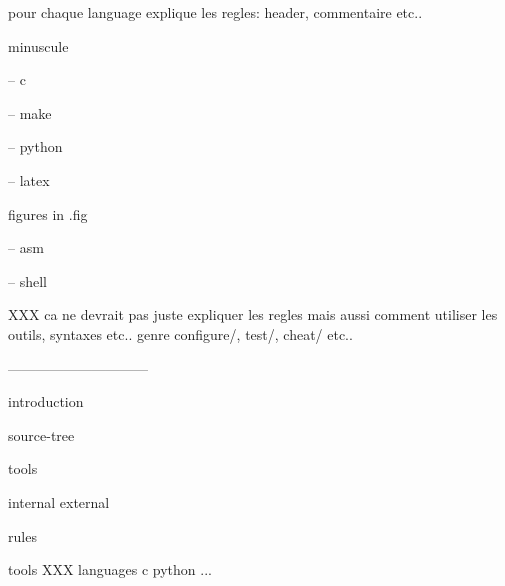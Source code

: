 pour chaque language explique les regles: header, commentaire etc..

minuscule

-- c

-- make

-- python

-- latex

figures in .fig

-- asm

-- shell

XXX
ca ne devrait pas juste expliquer les regles mais aussi comment utiliser
les outils, syntaxes etc.. genre configure/, test/, cheat/ etc..

------------------------------

introduction

source-tree

tools

  internal
  external

rules

  tools
    XXX
  languages
    c
    python
    ...